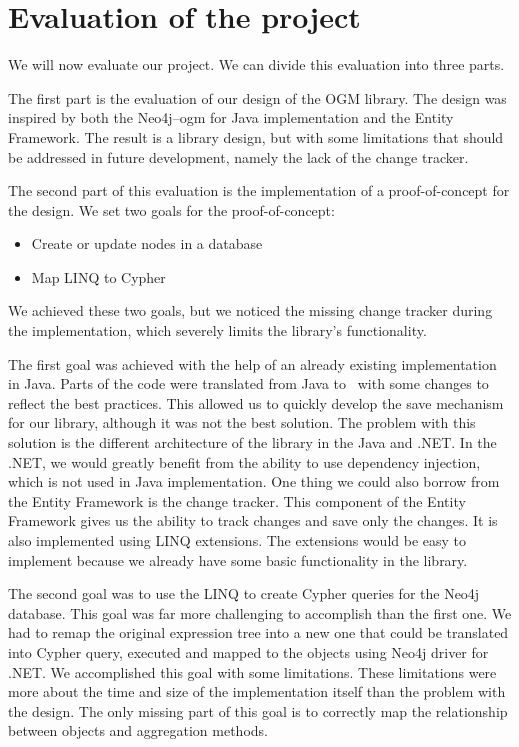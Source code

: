 \chapter{Evaluation of the project}

We will now evaluate our project. We can divide this evaluation into three parts.

The first part is the evaluation of our design of the OGM library. The design was inspired by both the Neo4j--\acrshort{ogm} for Java implementation and the Entity Framework.
The result is a library design, but with some limitations that should be addressed in future development, namely the lack of the change tracker.

The second part of this evaluation is the implementation of a proof-of-concept for the design.
We set two goals for the proof-of-concept:
\begin{itemize}
    \item {Create or update nodes in a database}
    \item {Map LINQ to Cypher}
\end{itemize}
We achieved these two goals, but we noticed the missing change tracker during the implementation, which severely limits the library's functionality.

The first goal was achieved with the help of an already existing implementation in Java. Parts of the code were translated from Java to \CS\ with some changes to reflect the best practices.
This allowed us to quickly develop the save mechanism for our library, although it was not the best solution.
The problem with this solution is the different architecture of the library in the Java and .NET.
In the .NET, we would greatly benefit from the ability to use dependency injection, which is not used in Java implementation.
One thing we could also borrow from the Entity Framework is the change tracker. This component of the Entity Framework gives us the ability to track changes and save only the changes. It is also implemented using LINQ extensions.
The extensions would be easy to implement because we already have some basic functionality in the library.

The second goal was to use the LINQ to create Cypher queries for the Neo4j database.
This goal was far more challenging to accomplish than the first one.
We had to remap the original expression tree into a new one that could be translated into Cypher query, executed and mapped to the objects using Neo4j driver for .NET.
We accomplished this goal with some limitations. These limitations were more about the time and size of the implementation itself than the problem with the design.
The only missing part of this goal is to correctly map the relationship between objects and aggregation methods.

